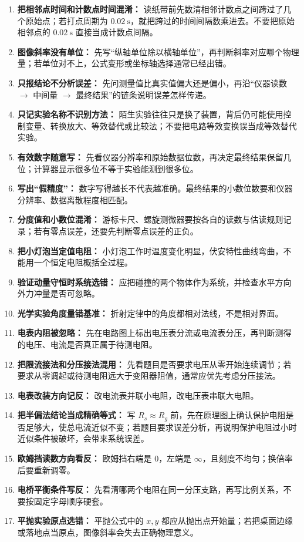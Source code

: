 \begin{mistakebox}
\begin{enumerate}
  \item \textbf{把相邻点时间和计数点时间混淆：} 读纸带前先数清相邻计数点之间跨过了几个原始点；若打点周期为 $0.02\ \mathrm{s}$，就把跨过的时间间隔数乘进去。不要把原始相邻点的 $0.02\ \mathrm{s}$ 直接当成计数点间隔。
  \item \textbf{图像斜率没有单位：} 先写“纵轴单位除以横轴单位”，再判断斜率对应哪个物理量；若单位对不上，公式变形或坐标轴选择通常已经出错。
  \item \textbf{只报结论不分析误差：} 先问测量值比真实值偏大还是偏小，再沿“仪器读数 $\to$ 中间量 $\to$ 最终结果”的链条说明误差怎样传递。
  \item \textbf{只记实验名称不识别方法：} 陌生实验往往只是换了装置，背后仍可能使用控制变量、转换放大、等效替代或比较法；不要把电路等效变换误当成等效替代实验。
  \item \textbf{有效数字随意写：} 先看仪器分辨率和原始数据位数，再决定最终结果保留几位；计算器显示很多位不等于实验能测到很多位。
  \item \textbf{写出“假精度”：} 数字写得越长不代表越准确。最终结果的小数位数要和仪器分辨率、数据离散程度相匹配。
  \item \textbf{分度值和小数位混淆：} 游标卡尺、螺旋测微器要按各自的读数与估读规则记录；若有零点误差，还要先判断零点误差的正负。
  \item \textbf{把小灯泡当定值电阻：} 小灯泡工作时温度变化明显，伏安特性曲线弯曲，不能用一个恒定电阻概括全过程。
  \item \textbf{验证动量守恒时系统选错：} 应把碰撞的两个物体作为系统，并检查水平方向外力冲量是否可忽略。
  \item \textbf{光学实验角度量错基准：} 折射定律中的角度都相对法线，不是相对界面。
  \item \textbf{电表内阻被忽略：} 先在电路图上标出电压表分流或电流表分压，再判断测得的电压、电流是否真正属于待测电阻。
  \item \textbf{把限流接法和分压接法混用：} 先看题目是否要求电压从零开始连续调节；若要求从零调起或待测电阻远大于变阻器阻值，通常应优先考虑分压接法。
  \item \textbf{电表改装方向记反：} 改电流表并联小电阻，改电压表串联大电阻。
  \item \textbf{把半偏法结论当成精确等式：} 写 $R_s\approx R_g$ 前，先在原理图上确认保护电阻是否足够大，使总电流近似不变；若题目要求误差分析，再说明保护电阻过小时近似条件被破坏，会带来系统误差。
  \item \textbf{欧姆挡读数方向看反：} 欧姆挡右端是 $0$，左端是 $\infty$，且刻度不均匀；换倍率后要重新调零。
  \item \textbf{电桥平衡条件写反：} 先看清哪两个电阻在同一分压支路，再写比例关系，不要按固定字母顺序硬套。
  \item \textbf{平抛实验原点选错：} 平抛公式中的 $x,y$ 都应从抛出点开始量；若把桌面边缘或落地点当原点，图像斜率会失去正确物理意义。
\end{enumerate}
\end{mistakebox}

